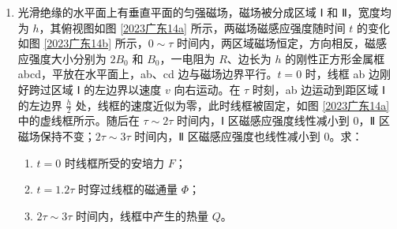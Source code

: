 \documentclass[\gkver]{gaokaozhenti}
\begin{document}
\begin{enumerate}


\item
光滑绝缘的水平面上有垂直平面的匀强磁场，磁场被分成区域 Ⅰ 和 Ⅱ，宽度均为 $h$，其俯视图如图 \ref{2023广东14a} 所示，两磁场磁感应强度随时间 $t$ 的变化如图 \ref{2023广东14b} 所示，$0 \sim \tau$ 时间内，两区域磁场恒定，方向相反，磁感应强度大小分别为 $2B_{0}$ 和 $B_{0}$，一电阻为 $R$、边长为 $h$ 的刚性正方形金属框 abcd，平放在水平面上，ab、cd 边与磁场边界平行。$t = 0$ 时，线框 ab 边刚好跨过区域 Ⅰ 的左边界以速度 $v$ 向右运动。在 $\tau$ 时刻，ab 边运动到距区域 Ⅰ 的左边界 $\frac{h}{2}$ 处，线框的速度近似为零，此时线框被固定，如图 \ref{2023广东14a} 中的虚线框所示。随后在 $\tau \sim 2\tau$ 时间内，Ⅰ 区磁感应强度线性减小到 0，Ⅱ 区磁场保持不变；$2\tau \sim 3\tau$ 时间内，Ⅱ 区磁感应强度也线性减小到 0。求：

\begin{enumerate}
	\item
	$t = 0$ 时线框所受的安培力 $F$；
	\item
	$t = 1.2\tau$ 时穿过线框的磁通量 $\Phi$；
	\item
	$2\tau \sim 3\tau$ 时间内，线框中产生的热量 $Q$。
\end{enumerate}


\end{enumerate}
\end{document}
